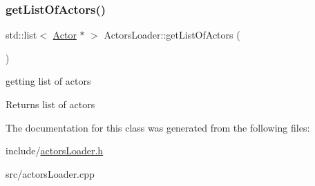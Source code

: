 \subsubsection{\texorpdfstring{get\+List\+Of\+Actors()}{getListOfActors()}}
{\footnotesize\ttfamily std\+::list$<$ \hyperlink{classActor}{Actor} $\ast$ $>$ Actors\+Loader\+::get\+List\+Of\+Actors (\begin{DoxyParamCaption}{ }\end{DoxyParamCaption})}



getting list of actors 

\begin{DoxyReturn}{Returns}
list of actors 
\end{DoxyReturn}


The documentation for this class was generated from the following files\+:\begin{DoxyCompactItemize}
\item 
include/\hyperlink{actorsLoader_8h}{actors\+Loader.\+h}\item 
src/actors\+Loader.\+cpp\end{DoxyCompactItemize}
